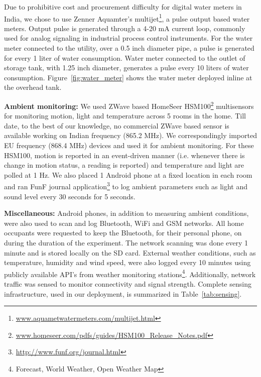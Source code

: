 \documentclass[10pt]{sensys-proc}
\newcommand{\figref}[1]{Figure~\ref{#1}}
\newcommand{\tabref}[1]{Table~\ref{#1}}
\begin{document}
Due to prohibitive cost and procurement difficulty for digital water meters in India, we chose to use Zenner Aquamter's multijet\footnote{\url{www.aquametwatermeters.com/multijet.html}}, a pulse output based water meters. Output pulse is generated through a 4-20 mA current loop, commonly used for analog signaling in industrial process control instruments. For the water meter connected to the utility, over a 0.5 inch diameter pipe, a pulse is generated for every 1 liter of water consumption. Water meter connected to the outlet of storage tank, with 1.25 inch diameter, generates a pulse every 10 liters of water consumption. %
\figref{fig:water_meter} shows the water meter deployed inline at the overhead tank.

\noindent \textbf{Ambient monitoring:} We used ZWave based HomeSeer HSM100\footnote{\url{www.homeseer.com/pdfs/guides/HSM100_Release_Notes.pdf}} multisensors for monitoring motion, light and temperature across 5 rooms in the home. Till date, to the best of our knowledge, no commercial ZWave based sensor is available working on Indian frequency (865.2 MHz). We correspondingly imported EU frequency (868.4 MHz) devices and used it for ambient monitoring. For these HSM100, motion is reported in an event-driven manner (i.e. whenever there is change in motion status, a reading is reported) and temperature and light are polled at 1 Hz. We also placed 1 Android phone at a fixed location in each room and ran FunF journal application\footnote{\url{http://www.funf.org/journal.html}} to log ambient parameters such as light and sound level every 30 seconds for 5 seconds.

\noindent \textbf{Miscellaneous:} Android phones, in addition to measuring ambient conditions, were also used to scan and log Bluetooth, WiFi and GSM networks. All home occupants were requested to keep the Bluetooth, for their personal phone, on during the duration of the experiment. The network scanning was done every 1 minute and is stored locally on the SD card. External weather conditions, such as temperature, humidity and wind speed, were also logged every 10 minutes using publicly available API's from weather monitoring stations\footnote{Forecast, World Weather, Open Weather Map}.
Additionally, network traffic was sensed to monitor connectivity and signal strength. %
Complete sensing infrastructure, used in our deployment, is summarized in \tabref{tab:sensing}.
\end{document}

